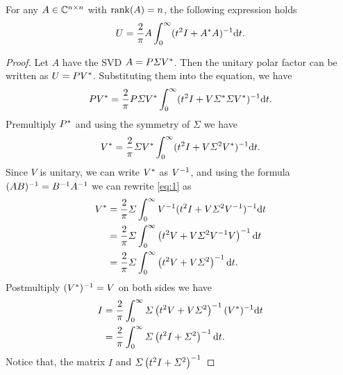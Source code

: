 \documentclass[12pt]{article}
\begin{document}
\begin{theorem}
	\label{thm:integralOfPolarFactor}
    For any $A\in\mathbb{C}^{n\times n}$ with $\mathrm{rank}(A) = n$, the following expression holds 
    \begin{equation}
        \label{eq:proof2.3} 
        U = \frac{2}{\pi} A \int_0^\infty (t^2 I + A ^* A)^{-1} \mathrm{d} t.
    \end{equation}
\end{theorem}

\begin{proof}
    Let $A$ have the SVD $A = P\varSigma V^*$. Then the unitary polar factor can be written as $U = PV^*$. Substituting them into the equation, we have 
    \begin{equation}
        \notag 
        PV^*  = \frac{2}{\pi} P\varSigma V^* \int_0^\infty (t^2 I + V\varSigma^* \varSigma V^*)^{-1} \mathrm{d} t.
    \end{equation}
    Premultiply $P^*$ and using the symmetry of $\Sigma$ we have 
    \begin{equation}
        \label{eq:1} 
        V^* = \frac{2}{\pi} \varSigma V^* \int_0^\infty (t^2 I + V\varSigma^2 V^*)^{-1} \mathrm{d} t.
    \end{equation}
    Since $V$ is unitary, we can write $V^*$ as $V^{-1}$, and using the formula $(AB)^{-1} = B^{-1} A^{-1}$ we can rewrite \eqref{eq:1} as 
    \begin{equation}
        \notag 
        \begin{aligned}
            V^* &= \frac{2}{\pi} \varSigma \int_0^\infty V^{-1} (t^2 I + V\varSigma^2 V^{-1})^{-1} \mathrm{d} t\\
            & = \frac{2}{\pi}\varSigma\int_0^\infty \left(t^2 V + V\varSigma^2 V^{-1} V\right)^{-1} \mathrm{d} t \\
            & = \frac{2}{\pi} \varSigma \int_0^\infty \left(t^2V + V\varSigma^2\right)^{-1} \mathrm{d} t.
        \end{aligned}
    \end{equation}
    Postmultiply $(V^*)^{-1} = V$ on both sides we have 
    \begin{equation}
        \notag 
        \begin{aligned}
            I &= \frac{2}{\pi}\int_0^\infty \varSigma \left(t^2 V + V \varSigma^2 \right)^{-1} (V^*)^{-1} \mathrm{d} t \\
            & = \frac{2}{\pi}\int_0^\infty \varSigma \left(t^2 I + \varSigma^2\right)^{-1} \mathrm{d} t.
        \end{aligned}
    \end{equation}
    Notice that, the matrix $I$ and $\varSigma\left(t^2 I + \varSigma^2\right)^{-1}$ 

\end{proof}
\end{document}
